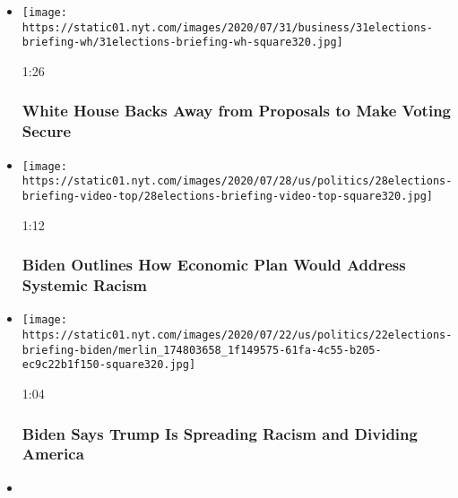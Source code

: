 \begin{itemize}
\item
  \href{https://www.nytimes.com/video/us/100000007267362/white-house-mail-in-ballots-election.html?action=click\&module=video-series-bar\&region=header\&pgtype=Article\&playlistId=video/2020-Elections}{}

  \texttt{[image: https://static01.nyt.com/images/2020/07/31/business/31elections-briefing-wh/31elections-briefing-wh-square320.jpg]}

  1:26

  \hypertarget{white-house-backs-away-from-proposals-to-make-voting-secure}{%
  \subsubsection{White House Backs Away from Proposals to Make Voting
  Secure}\label{white-house-backs-away-from-proposals-to-make-voting-secure}}
\item
  \href{https://www.nytimes.com/video/us/politics/100000007260487/watch-live-biden-delivers-speech-on-systemic-racism.html?action=click\&module=video-series-bar\&region=header\&pgtype=Article\&playlistId=video/2020-Elections}{}

  \texttt{[image: https://static01.nyt.com/images/2020/07/28/us/politics/28elections-briefing-video-top/28elections-briefing-video-top-square320.jpg]}

  1:12

  \hypertarget{biden-outlines-how-economic-plan-would-address-systemic-racism}{%
  \subsubsection{Biden Outlines How Economic Plan Would Address Systemic
  Racism}\label{biden-outlines-how-economic-plan-would-address-systemic-racism}}
\item
  \href{https://www.nytimes.com/video/us/100000007251300/biden-trump-racist-divide-america.html?action=click\&module=video-series-bar\&region=header\&pgtype=Article\&playlistId=video/2020-Elections}{}

  \texttt{[image: https://static01.nyt.com/images/2020/07/22/us/politics/22elections-briefing-biden/merlin\_174803658\_1f149575-61fa-4c55-b205-ec9c22b1f150-square320.jpg]}

  1:04

  \hypertarget{biden-says-trump-is-spreading-racism-and-dividing-america}{%
  \subsubsection{Biden Says Trump Is Spreading Racism and Dividing
  America}\label{biden-says-trump-is-spreading-racism-and-dividing-america}}
\item
  \href{https://www.nytimes.com/video/us/100000007249436/biden-announces-plan-to-aid-caregivers.html?action=click\&module=video-series-bar\&region=header\&pgtype=Article\&playlistId=video/2020-Elections}{}


\end{itemize}
